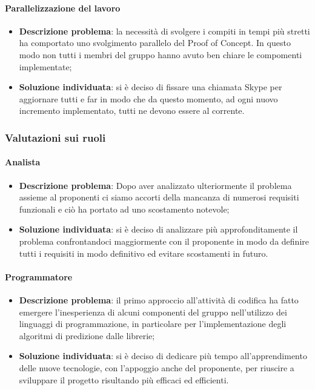 			\paragraph{Parallelizzazione del lavoro}
				\begin{itemize}
					\item \textbf{Descrizione problema}: la necessità di svolgere i compiti in tempi più stretti ha comportato uno svolgimento parallelo del Proof of Concept\glo. In questo modo non tutti i membri del gruppo hanno avuto ben chiare le compomenti implementate;
					\item \textbf{Soluzione individuata}: si è deciso di fissare una chiamata Skype per aggiornare tutti e far in modo che da questo momento, ad ogni nuovo incremento implementato, tutti ne devono essere al corrente.
				\end{itemize}
		\subsubsection{Valutazioni sui ruoli}
			\paragraph{Analista}
				\begin{itemize}
					\item \textbf{Descrizione problema}: Dopo aver analizzato ulteriormente il problema assieme al proponenti ci siamo accorti della mancanza di numerosi requisiti funzionali e ciò ha portato ad uno scostamento notevole;
					\item \textbf{Soluzione individuata}: si è deciso di analizzare più approfonditamente il problema confrontandoci maggiormente con il proponente in modo da definire tutti i requisiti in modo definitivo ed evitare scostamenti in futuro.
				\end{itemize}
			\paragraph{Programmatore}
				\begin{itemize}
					\item \textbf{Descrizione problema}: il primo approccio all'attività di codifica ha fatto emergere l'inesperienza di alcuni componenti del gruppo nell'utilizzo dei linguaggi di programmazione, in particolare per l'implementazione degli algoritmi di predizione dalle librerie;
					\item \textbf{Soluzione individuata}: si è deciso di dedicare più tempo all'apprendimento delle nuove tecnologie, con l'appoggio anche del proponente, per riuscire a sviluppare il progetto risultando più efficaci ed efficienti.
				\end{itemize}
